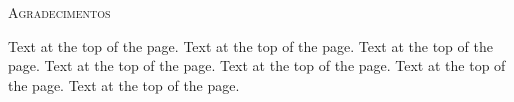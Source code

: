\clearpage
\thispagestyle{empty}
\begin{center}
\textsc{\LARGE Agradecimentos}\\[1.5cm]
\end{center}

Text at the top of the page. Text at the top of the page. 
Text at the top of the page. Text at the top of the page. 
Text at the top of the page. Text at the top of the page. 
Text at the top of the page.

